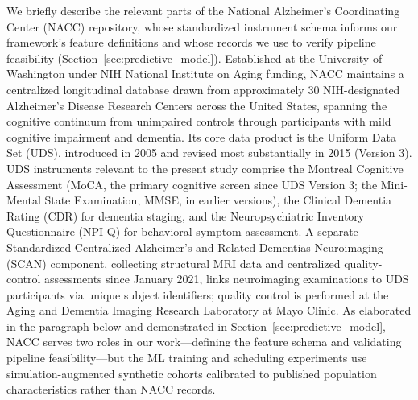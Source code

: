 \documentclass[11pt,a4paper]{article}
\begin{document}
We briefly describe the relevant parts of the National Alzheimer's Coordinating Center (NACC) repository, whose standardized instrument schema informs our framework's feature definitions and whose records we use to verify pipeline feasibility (Section~\ref{sec:predictive_model}). Established at the University of Washington under NIH National Institute on Aging funding, NACC maintains a centralized longitudinal database drawn from approximately 30 NIH-designated Alzheimer's Disease Research Centers across the United States, spanning the cognitive continuum from unimpaired controls through participants with mild cognitive impairment and dementia. Its core data product is the Uniform Data Set (UDS), introduced in 2005 and revised most substantially in 2015 (Version 3). UDS instruments relevant to the present study comprise the Montreal Cognitive Assessment (MoCA, the primary cognitive screen since UDS Version 3; the Mini-Mental State Examination, MMSE, in earlier versions), the Clinical Dementia Rating (CDR) for dementia staging, and the Neuropsychiatric Inventory Questionnaire (NPI-Q) for behavioral symptom assessment. A separate Standardized Centralized Alzheimer's and Related Dementias Neuroimaging (SCAN) component, collecting structural MRI data and centralized quality-control assessments since January 2021, links neuroimaging examinations to UDS participants via unique subject identifiers; quality control is performed at the Aging and Dementia Imaging Research Laboratory at Mayo Clinic. As elaborated in the paragraph below and demonstrated in Section~\ref{sec:predictive_model}, NACC serves two roles in our work---defining the feature schema and validating pipeline feasibility---but the ML training and scheduling experiments use simulation-augmented synthetic cohorts calibrated to published population characteristics rather than NACC records.
\end{document}
